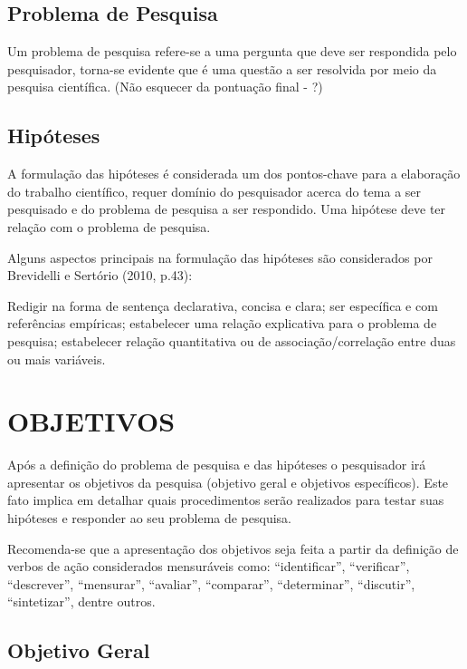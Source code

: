 \subsection{Problema de Pesquisa}
\label{problemadepesquisa}
Um problema de pesquisa refere-se a uma pergunta que deve ser respondida pelo
pesquisador, torna-se evidente que é uma questão a ser resolvida por meio da pesquisa
científica. (Não esquecer da pontuação final - ?)
\subsection{Hipóteses}
\label{hipoteses}
A formulação das hipóteses é considerada um dos pontos-chave para a elaboração do
trabalho científico, requer domínio do pesquisador acerca do tema a ser pesquisado e do
problema de pesquisa a ser respondido. Uma hipótese deve ter relação com o problema de
pesquisa.

Alguns aspectos principais na formulação das hipóteses são considerados por Brevidelli
e Sertório (2010, p.43):
\begin{citacao}
Redigir na forma de sentença declarativa, concisa e clara; ser específica e com
referências empíricas; estabelecer uma relação explicativa para o problema de
pesquisa; estabelecer relação quantitativa ou de associação/correlação entre duas ou
mais variáveis.
\end{citacao}

\section{OBJETIVOS}
\label{objetivos}

Após a definição do problema de pesquisa e das hipóteses o pesquisador irá apresentar
os objetivos da pesquisa (objetivo geral e objetivos específicos).
Este fato implica em detalhar quais procedimentos serão realizados para testar suas
hipóteses e responder ao seu problema de pesquisa.

Recomenda-se que a apresentação dos objetivos seja feita a partir da definição de
verbos de ação considerados mensuráveis como: “identificar”, “verificar”, “descrever”,
“mensurar”, “avaliar”, “comparar”, “determinar”, “discutir”, “sintetizar”, dentre outros.
\subsection{Objetivo Geral}
\label{objetivogeral}

